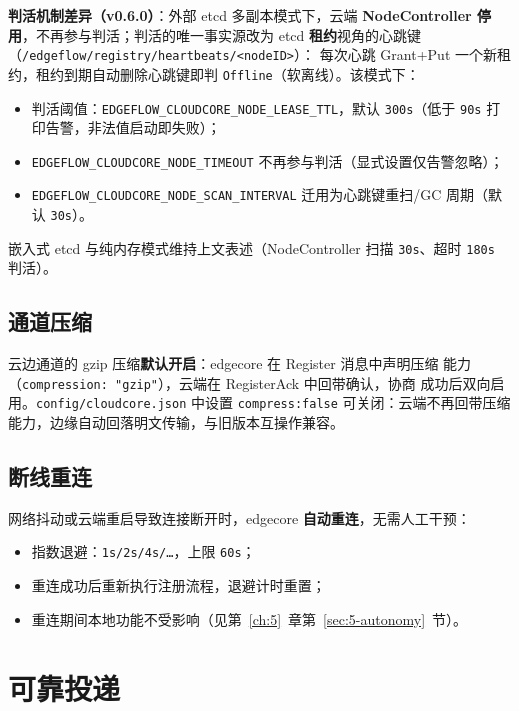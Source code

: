 \textbf{判活机制差异（v0.6.0）}：外部 etcd 多副本模式下，云端
\textbf{NodeController 停用}，不再参与判活；判活的唯一事实源改为 etcd
\textbf{租约}视角的心跳键（\texttt{/edgeflow/registry/heartbeats/<nodeID>}）：
每次心跳 Grant+Put 一个新租约，租约到期自动删除心跳键即判
\texttt{Offline}（软离线）。该模式下：

\begin{itemize}
  \item 判活阈值：\texttt{EDGEFLOW\_CLOUDCORE\_NODE\_LEASE\_TTL}，默认 \texttt{300s}（低于 \texttt{90s} 打印告警，非法值启动即失败）；
  \item \texttt{EDGEFLOW\_CLOUDCORE\_NODE\_TIMEOUT} 不再参与判活（显式设置仅告警忽略）；
  \item \texttt{EDGEFLOW\_CLOUDCORE\_NODE\_SCAN\_INTERVAL} 迁用为心跳键重扫/GC 周期（默认 \texttt{30s}）。
\end{itemize}

嵌入式 etcd 与纯内存模式维持上文表述（NodeController 扫描 \texttt{30s}、超时 \texttt{180s} 判活）。

\subsection{通道压缩}

云边通道的 gzip 压缩\textbf{默认开启}：edgecore 在 Register 消息中声明压缩
能力（\texttt{compression: "gzip"}），云端在 RegisterAck 中回带确认，协商
成功后双向启用。\texttt{config/cloudcore.json} 中设置 \texttt{compress:false}
可关闭：云端不再回带压缩能力，边缘自动回落明文传输，与旧版本互操作兼容。

\subsection{断线重连}

网络抖动或云端重启导致连接断开时，edgecore \textbf{自动重连}，无需人工干预：

\begin{itemize}
  \item 指数退避：\texttt{1s/2s/4s/…}，上限 \texttt{60s}；
  \item 重连成功后重新执行注册流程，退避计时重置；
  \item 重连期间本地功能不受影响（见第~\ref{ch:5}~章第~\ref{sec:5-autonomy}~节）。
\end{itemize}

\section{可靠投递}


